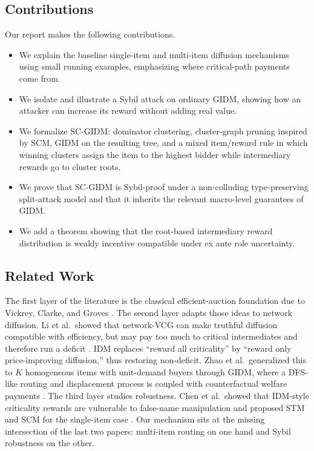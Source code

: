 \documentclass[sigconf]{aamas}
\theoremstyle{definition}
\theoremstyle{remark}
\begin{document}
\subsection{Contributions}
Our report makes the following contributions.
\begin{itemize}[leftmargin=1.5em]
    \item We explain the baseline single-item and multi-item diffusion mechanisms using small running examples, emphasizing where critical-path payments come from.
    \item We isolate and illustrate a Sybil attack on ordinary GIDM, showing how an attacker can increase its reward without adding real value.
    \item We formalize SC-GIDM: dominator clustering, cluster-graph pruning inspired by SCM, GIDM on the resulting tree, and a mixed item/reward rule in which winning clusters assign the item to the highest bidder while intermediary rewards go to cluster roots.
    \item We prove that SC-GIDM is Sybil-proof under a non-colluding type-preserving split-attack model and that it inherits the relevant macro-level guarantees of GIDM.
    \item We add a theorem showing that the root-based intermediary reward distribution is weakly incentive compatible under ex ante role uncertainty.
\end{itemize}

\subsection{Related Work}
The first layer of the literature is the classical efficient-auction foundation due to Vickrey, Clarke, and Groves \cite{Vickrey61,Clarke71,Groves73}. The second layer adapts those ideas to network diffusion. Li et al.\ showed that network-VCG can make truthful diffusion compatible with efficiency, but may pay too much to critical intermediates and therefore run a deficit \cite{LiHZZ17}. IDM replaces ``reward all criticality'' by ``reward only price-improving diffusion,'' thus restoring non-deficit. Zhao et al.\ generalized this to $K$ homogeneous items with unit-demand buyers through GIDM, where a DFS-like routing and displacement process is coupled with counterfactual welfare payments \cite{ZhaoLXHJ18}. The third layer studies robustness. Chen et al.\ showed that IDM-style criticality rewards are vulnerable to false-name manipulation and proposed STM and SCM for the single-item case \cite{ChenDWWZ23}. Our mechanism sits at the missing intersection of the last two papers: multi-item routing on one hand and Sybil robustness on the other.
\end{document}
